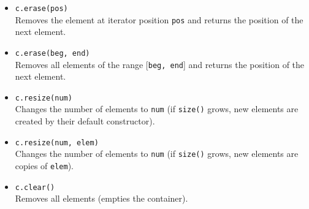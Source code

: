 \documentclass{report}
\begin{document}
\begin{itemize}
    \item \texttt{c.erase(pos)} \\
          Removes the element at iterator position \texttt{pos} and returns the position of the next element.
          
    \item \texttt{c.erase(beg, end)} \\
          Removes all elements of the range [\texttt{beg, end}] and returns the position of the next element.
          
    \item \texttt{c.resize(num)} \\
          Changes the number of elements to \texttt{num} (if \texttt{size()} grows, new elements are created by their default constructor).
          
    \item \texttt{c.resize(num, elem)} \\
          Changes the number of elements to \texttt{num} (if \texttt{size()} grows, new elements are copies of \texttt{elem}).
          
    \item \texttt{c.clear()} \\
          Removes all elements (empties the container).
\end{itemize}

\pagebreak 
{}
\bigbreak \noindent 
\end{document}
